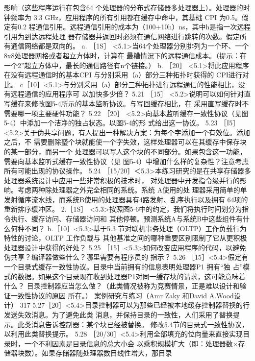 影响（这些程序运行在包含64 个处理器的分布式存储器多处理器上）。处理器的时钟频率为
3.3 GHz，应用程序的所有引用都在缓存中命中，其基础 CPI 为0.5。假定有0.2%
程通信引用。远程通信引用的成本为（100+10h）ns，其中h是指一次远程引用为到达远程处理
器存储器并返回时必须在通信网络进行跳转的次数。假定所有通信网络都是双向的。
a. ［1S］ <5.1>当64个处理器分别排列为一个环、一个8x8处理器网格或者超立方体时，计算在
最糟情況下的远程通信成本。（提示：在一个2”超立方体中，最长的通信路径有n个链接。）
b. ［20］ <5.1>将此应用程序在没有远程通信时的基本CPI 与分别采用（a）部分三种拓扑时获得的
CPI进行对比。
c［10］<5.1>与分别采用（a）部分三种拓扑进行远程通信的性能相比，没有远程通信的应用程序可
以加快多少倍？
5.21 ［15］ <5.2>说明可以如何针对直写缓存来修改图5-4所示的基本监听协议。与写回缓存相比，在
采用直写缓存时不需要哪一项主要硬件功能？
5.22 ［20］ <5.2>向基本监听缓存一致性协议（见图5-4）中添加一个洁净的独占状态。以图5-4的形
式给出这一协议。
5.23
［I5］<5.2>关于伪共享问题，有人提出一种解决方案：为每个字添加一个有效位。添加之后，不
需要删除𤦂个块就能使一个字失效，这样处理器可以在其缓存中保存块的某一部分，而另一个
处理器可以写人这个块的不同部分。如果包含这一功能，需要向基本监听式缓存一致性协议（见
图5-4）中增加什么样的复杂性？注意考虑所有可能出现的协议操作。
5.24 ［15/20］＜5.3>本练习研究的是在共享存储器多处理器系统设计中应用一些非常积极的技术时，
对处理器中开发指令级并行的影响。考虑两种除处理器之外完全相同的系统。系统 A使用的处
理器采用简单的单发射循序流水线，而系统B使用的处理器具有4路发射、乱序执行以及拥有
64项的重新排序缓冲区。
2.［1S］ <5.3>按照图5-6中的约定，我们将执行时间划分为指令执行、缓存访问、存储器访问和
其他停顿。预测系统A与系统B中这些组件有什么何种不同？
b.［10］<5.3>基于5.3 节对联机事务处理（OLTP）工作负载行为特性的讨论，OLTP 工作负载与
其他基准之间的哪种重要区别限制了它从更积极处理器设计中获得的好处？
5.25 ［15］<5.3>如何改变应用程序的代码，以避免伪共享？编译器做些什么？哪里需要有程序员的
指示？
5.26 ［15］<5.4>假定有一个目录式缓存一致性协议。目录中当前拥有的信息表明处理器P1 拥有“独
占”模式的数据。如果这个目录现在收到处理器P1对同一缓存块的请求，这可能意味着什么？
目录控制器应当怎么做？（此类情况被称为竞赛情景，正是难以设计和验证一致性协议的原因
所在。）
案例研究与练习（Amr Zaky 和David A.Wood设计）
317
5.27［20］<5.4>目录控制器可以为那些已经被本地缓存控制器替换的行发送失效消息。为了避免此类
消息，并保持目录的一致性，人们采用了替换提示。此类消息告诉控制器：某个块已经被替换。
修改5.4节的目录式一致性协议，以利用此类替换提示。
5.28
［20/30］<5.4>利用全部填充的位向量来直接实现目录时，一个不利因素是目录信息的总大小会
以乘积规模扩大（即：处理器数×存储器块数）。如果存储器随处理器数目线性增大，那目录

